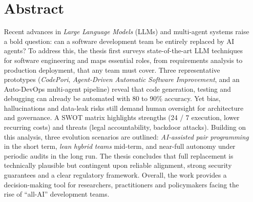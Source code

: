 \section*{Abstract}
Recent advances in \emph{Large Language Models} (LLMs) and multi-agent systems raise a bold question: can a software development team be entirely replaced by AI agents?  To address this, the thesis first surveys state-of-the-art LLM techniques for software engineering and maps essential roles, from requirements analysis to production deployment, that any team must cover.  Three representative prototypes (\textit{CodePori}, \textit{Agent-Driven Automatic Software Improvement}, and an Auto-DevOps multi-agent pipeline) reveal that code generation, testing and debugging can already be automated with 80 to 90\% accuracy.  Yet bias, hallucinations and data-leak risks still demand human oversight for architecture and governance.  A SWOT matrix highlights strengths (24 / 7 execution, lower recurring costs) and threats (legal accountability, backdoor attacks).  Building on this analysis, three evolution scenarios are outlined: \emph{AI-assisted pair programming} in the short term, \emph{lean hybrid teams} mid-term, and near-full autonomy under periodic audits in the long run.  The thesis concludes that full replacement is technically plausible but contingent upon reliable alignment, strong security guarantees and a clear regulatory framework.  Overall, the work provides a decision-making tool for researchers, practitioners and policymakers facing the rise of “all-AI” development teams.
